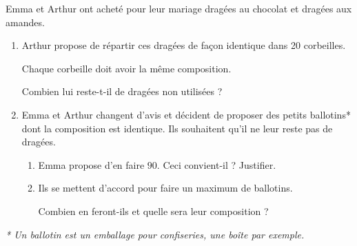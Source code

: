
Emma et Arthur ont acheté pour leur mariage  dragées au chocolat et  dragées aux amandes.

\medskip
 
\begin{enumerate}
\item Arthur propose de répartir ces dragées de façon identique dans 20 corbeilles.
 
Chaque corbeille doit avoir la même composition.
 
Combien lui reste-t-il de dragées non utilisées ? 
\item Emma et Arthur changent d'avis et décident de proposer des petits ballotins* dont la composition est identique. Ils souhaitent qu'il ne leur reste pas de dragées. 
	\begin{enumerate}
		\item Emma propose d'en faire $90$. Ceci convient-il ? Justifier. 
		\item Ils se mettent d'accord pour faire un maximum de ballotins.
		
Combien en feront-ils et quelle sera leur composition ? 

 
	\end{enumerate}
\end{enumerate}

\emph{* Un ballotin est un emballage pour confiseries, une boîte par exemple.}





